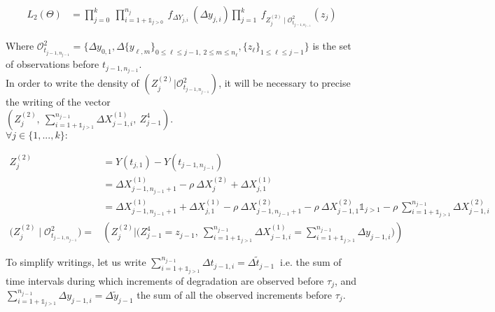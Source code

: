 \begin{align}
L_2(\Theta)&= \prod \limits_{j=0}^k\  \prod \limits_{i=1+\mathds{1}_{j>0}}^{n_{j}} \ f_{\Delta Y_{j,i}}\ (\Delta y_{j,i})\prod \limits_{j=1}^k \ f_{Z_j^{(2)} \mid \mathcal{O}^2_{t_{j-1,n_{j-1}}}}(z_j) 
\end{align}


\noindent Where $\mathcal{O}^2_{t_{j-1,n_{j-1}}}=\{\Delta y_{0,1},\Delta \{y_{\ell,m}\}_{0\leq \ell \leq j-1, \ 2 \leq m \leq n_{\ell} },\{z_{\ell}\}_{1 \leq \ell \leq  j-1}\}$ is the set of observations before $ t_{j-1,n_{j-1}}$.\\

\noindent In order to write the density of $\left(Z_j^{(2)} \bigg |  \mathcal{O}^2_{t_{j-1,n_{j-1}}}\right)$, it will be necessary to precise the writing of the vector \\
$\displaystyle \left(Z_j^{(2)},\ \sum\limits_{i=1+\mathds{1}_{j>1}}^{n_{j-1}}\Delta X^{(1)}_{j-1,i},\ Z_{j-1}^4\right)$.\\[0.3 cm]

$\forall j \in \{1,...,k\} :$

\begin{align}
Z_j^{(2)}&=Y(t_{j,1})-Y(t_{j-1,n_{j-1}}) \nonumber\\
&=\Delta X^{(1)}_{j-1,n_{j-1}+1}-\rho\ \Delta X^{(2)}_j + \Delta X^{(1)}_{j,1} \\[0.3 cm]
&=\Delta X^{(1)}_{j-1,n_{j-1}+1} + \Delta X^{(1)}_{j,1}-\rho\ \Delta X^{(2)}_{j-1,n_{j-1}+1}-\rho\ \Delta X^{(2)}_{j-1,1}\mathds{1}_{j>1}-\rho\ \sum\limits_{i=1+\mathds{1}_{j>1}}^{n_{j-1}} \Delta X^{(2)}_{j-1,i} \\
\displaystyle \bigg(Z_j^{(2)} \mid \mathcal{O}^2_{t_{j-1,n_{j-1}}} \bigg )=&\left( Z_j^{(2)}   \Bigg | \Bigg( Z_{j-1}^4=z_{j-1},\ \sum\limits_{i=1+\mathds{1}_{j>1}}^{n_{j-1}}\Delta X^{(1)}_{j-1,i}=\sum\limits_{i=1+\mathds{1}_{j>1}}^{n_{j-1}}\Delta y_{j-1,i}\Bigg) \right) 
\label{eq:saut}
\end{align}

To simplify writings,  let us write $\displaystyle \sum\limits_{i=1+\mathds{1}_{j>1}}^{n_{j-1}}  \Delta t_{j-1,i} = \Delta \tilde t_{j-1}\ $ i.e. the sum of time intervals during which increments of degradation are observed before $\tau_j$, and $\sum\limits_{i=1+\mathds{1}_{j>1}}^{n_{j-1}}  \Delta y_{j-1,i} = \Delta \tilde y_{j-1}$ the sum of all the observed increments before $\tau_j$.\\

